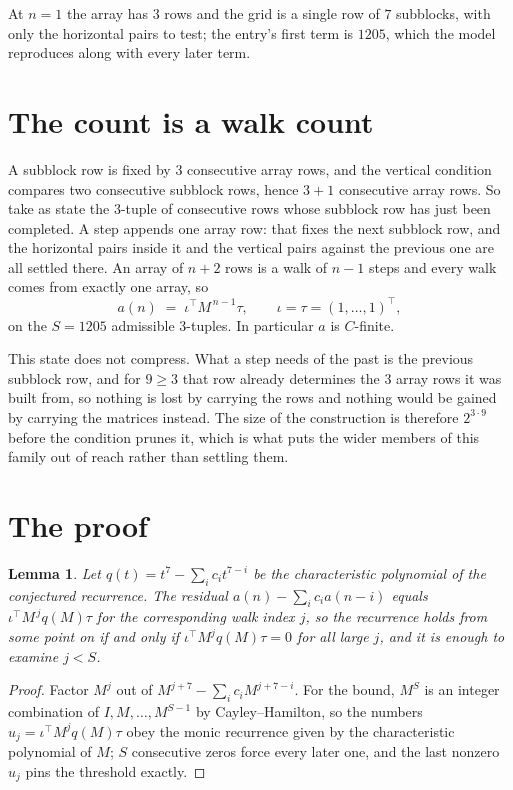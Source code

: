 \documentclass[11pt,a4paper]{article}
\theoremstyle{plain}
\newtheorem{lemma}[theorem]{Lemma}
\theoremstyle{definition}
\begin{document}
At $n=1$ the array has $3$ rows and the grid is a single row of $7$
subblocks, with only the horizontal pairs to test; the entry's first term is
$1205$, which the model reproduces along with every later term.

\section{The count is a walk count}

A subblock row is fixed by $3$ consecutive array rows, and the vertical condition compares
two consecutive subblock rows, hence $3+1$ consecutive array rows. So take as state the
$3$-tuple of consecutive rows whose subblock row has just been completed. A step appends one
array row: that fixes the next subblock row, and the horizontal pairs inside it and the
vertical pairs against the previous one are all settled there. An array of $n+2$ rows is
a walk of $n-1$ steps and every walk comes from exactly one array, so
\[
a(n)\;=\;\iota^{\!\top}M^{\,n-1}\tau,\qquad\iota=\tau=(1,\dots,1)^{\!\top},
\]
on the $S=1205$ admissible $3$-tuples. In particular $a$ is $C$-finite.

This state does not compress. What a step needs of the past is the previous subblock row, and
for $9\ge3$ that row already determines the $3$ array rows it was built from, so nothing
is lost by carrying the rows and nothing would be gained by carrying the matrices instead. The
size of the construction is therefore $2^{3\cdot9}$ before the condition prunes
it, which is what puts the wider members of this family out of reach rather than settling them.

\section{The proof}

\begin{lemma}\label{lem:crit}
Let $q(t)=t^{7}-\sum_i c_it^{7-i}$ be the characteristic polynomial of the
conjectured recurrence. The residual $a(n)-\sum_ic_ia(n-i)$ equals
$\iota^{\!\top}M^{\,j}q(M)\tau$ for the corresponding walk index $j$, so the recurrence
holds from some point on if and only if $\iota^{\!\top}M^{j}q(M)\tau=0$ for all large $j$,
and it is enough to examine $j<S$.
\end{lemma}

\begin{proof}
Factor $M^{j}$ out of $M^{j+7}-\sum_ic_iM^{j+7-i}$. For the bound, $M^{S}$
is an integer combination of $I,M,\dots,M^{S-1}$ by Cayley--Hamilton, so the numbers
$u_j=\iota^{\!\top}M^{j}q(M)\tau$ obey the monic recurrence given by the characteristic
polynomial of $M$; $S$ consecutive zeros force every later one, and the last nonzero $u_j$
pins the threshold exactly.
\end{proof}
\end{document}
